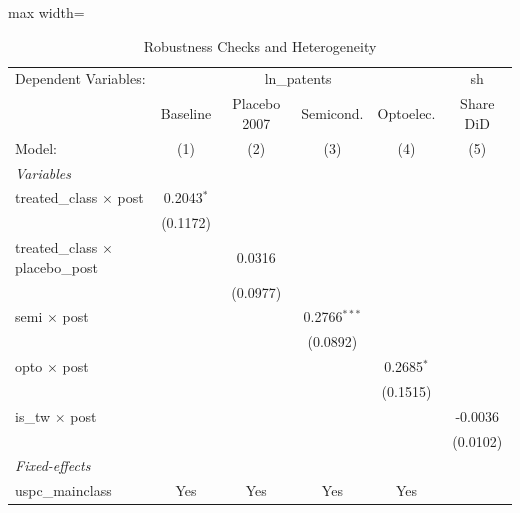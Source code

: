 
\begin{table}[htbp]
   \caption{\label{tab:robustness} Robustness Checks and Heterogeneity}
   \centering
   \begin{adjustbox}{max width=\textwidth}\begin{tabular}{lccccc}
      \tabularnewline \midrule \midrule
      Dependent Variables: & \multicolumn{4}{c}{ln\_patents} & sh\\
                                               & Baseline     & Placebo 2007 & Semicond.      & Optoelec.    & Share DiD \\   
      Model:                                   & (1)          & (2)          & (3)            & (4)          & (5)\\  
      \midrule
      \emph{Variables}\\
      treated\_class $\times$ post             & 0.2043$^{*}$ &              &                &              &   \\   
                                               & (0.1172)     &              &                &              &   \\   
      treated\_class $\times$ placebo\_post    &              & 0.0316       &                &              &   \\   
                                               &              & (0.0977)     &                &              &   \\   
      semi $\times$ post                       &              &              & 0.2766$^{***}$ &              &   \\   
                                               &              &              & (0.0892)       &              &   \\   
      opto $\times$ post                       &              &              &                & 0.2685$^{*}$ &   \\   
                                               &              &              &                & (0.1515)     &   \\   
      is\_tw $\times$ post                     &              &              &                &              & -0.0036\\   
                                               &              &              &                &              & (0.0102)\\   
      \midrule
      \emph{Fixed-effects}\\
      uspc\_mainclass                          & Yes          & Yes          & Yes            & Yes          & \\  

\end{tabular}
\end{adjustbox}
\end{table}
